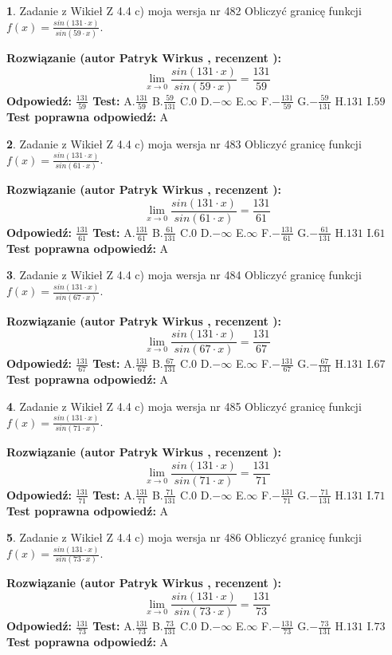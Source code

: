 \documentclass[12pt, a4paper]{article}
\theoremstyle{definition} %
\newtheorem{zad}{}
\newcommand{\zadStart}[1]{\begin{zad}#1\newline}
\newcommand{\zadStop}{\end{zad}}
\newcommand{\rozwStart}[2]{\noindent \textbf{Rozwiązanie (autor #1 , recenzent #2): }\newline}
\newcommand{\rozwStop}{\newline}
\newcommand{\odpStart}{\noindent \textbf{Odpowiedź:}\newline}
\newcommand{\odpStop}{\newline}
\newcommand{\testStart}{\noindent \textbf{Test:}\newline}
\newcommand{\testStop}{\newline}
\newcommand{\kluczStart}{\noindent \textbf{Test poprawna odpowiedź:}\newline}
\newcommand{\kluczStop}{\newline}
\begin{document}
\zadStart{Zadanie z Wikieł Z 4.4 c) moja wersja nr 482}
Obliczyć granicę funkcji $f(x)=\frac{sin(131\cdot x)}{sin(59\cdot x)}$.
\zadStop
\rozwStart{Patryk Wirkus}{}
$$\lim\limits_{x\to 0}\frac{sin(131\cdot x)}{sin(59\cdot x)}=
\frac{131}{59}$$
\rozwStop
\odpStart
$\frac{131}{59}$
\odpStop
\testStart
A.$\frac{131}{59}$
B.$\frac{59}{131}$
C.$0$
D.$-\infty$
E.$\infty$
F.$-\frac{131}{59}$
G.$-\frac{59}{131}$
H.$131$
I.$59$
\testStop
\kluczStart
A
\kluczStop



\zadStart{Zadanie z Wikieł Z 4.4 c) moja wersja nr 483}
Obliczyć granicę funkcji $f(x)=\frac{sin(131\cdot x)}{sin(61\cdot x)}$.
\zadStop
\rozwStart{Patryk Wirkus}{}
$$\lim\limits_{x\to 0}\frac{sin(131\cdot x)}{sin(61\cdot x)}=
\frac{131}{61}$$
\rozwStop
\odpStart
$\frac{131}{61}$
\odpStop
\testStart
A.$\frac{131}{61}$
B.$\frac{61}{131}$
C.$0$
D.$-\infty$
E.$\infty$
F.$-\frac{131}{61}$
G.$-\frac{61}{131}$
H.$131$
I.$61$
\testStop
\kluczStart
A
\kluczStop



\zadStart{Zadanie z Wikieł Z 4.4 c) moja wersja nr 484}
Obliczyć granicę funkcji $f(x)=\frac{sin(131\cdot x)}{sin(67\cdot x)}$.
\zadStop
\rozwStart{Patryk Wirkus}{}
$$\lim\limits_{x\to 0}\frac{sin(131\cdot x)}{sin(67\cdot x)}=
\frac{131}{67}$$
\rozwStop
\odpStart
$\frac{131}{67}$
\odpStop
\testStart
A.$\frac{131}{67}$
B.$\frac{67}{131}$
C.$0$
D.$-\infty$
E.$\infty$
F.$-\frac{131}{67}$
G.$-\frac{67}{131}$
H.$131$
I.$67$
\testStop
\kluczStart
A
\kluczStop



\zadStart{Zadanie z Wikieł Z 4.4 c) moja wersja nr 485}
Obliczyć granicę funkcji $f(x)=\frac{sin(131\cdot x)}{sin(71\cdot x)}$.
\zadStop
\rozwStart{Patryk Wirkus}{}
$$\lim\limits_{x\to 0}\frac{sin(131\cdot x)}{sin(71\cdot x)}=
\frac{131}{71}$$
\rozwStop
\odpStart
$\frac{131}{71}$
\odpStop
\testStart
A.$\frac{131}{71}$
B.$\frac{71}{131}$
C.$0$
D.$-\infty$
E.$\infty$
F.$-\frac{131}{71}$
G.$-\frac{71}{131}$
H.$131$
I.$71$
\testStop
\kluczStart
A
\kluczStop



\zadStart{Zadanie z Wikieł Z 4.4 c) moja wersja nr 486}
Obliczyć granicę funkcji $f(x)=\frac{sin(131\cdot x)}{sin(73\cdot x)}$.
\zadStop
\rozwStart{Patryk Wirkus}{}
$$\lim\limits_{x\to 0}\frac{sin(131\cdot x)}{sin(73\cdot x)}=
\frac{131}{73}$$
\rozwStop
\odpStart
$\frac{131}{73}$
\odpStop
\testStart
A.$\frac{131}{73}$
B.$\frac{73}{131}$
C.$0$
D.$-\infty$
E.$\infty$
F.$-\frac{131}{73}$
G.$-\frac{73}{131}$
H.$131$
I.$73$
\testStop
\kluczStart
A
\kluczStop
\end{document}

